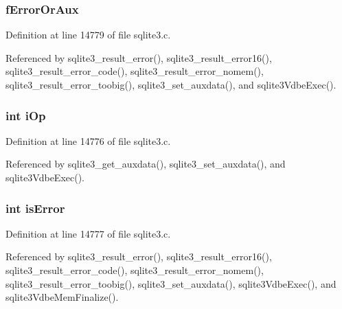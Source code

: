 \subsubsection[{f\+Error\+Or\+Aux}]{ f\+Error\+Or\+Aux}\label{structsqlite3__context_a8899b33d4af2040a45f2159eed439c0b}


Definition at line 14779 of file sqlite3.\+c.



Referenced by sqlite3\+\_\+result\+\_\+error(), sqlite3\+\_\+result\+\_\+error16(), sqlite3\+\_\+result\+\_\+error\+\_\+code(), sqlite3\+\_\+result\+\_\+error\+\_\+nomem(), sqlite3\+\_\+result\+\_\+error\+\_\+toobig(), sqlite3\+\_\+set\+\_\+auxdata(), and sqlite3\+Vdbe\+Exec().

\hypertarget{structsqlite3__context_a7d4638420dcef0fb9e0120bad40857e3}{}
\subsubsection[{i\+Op}]{\setlength{\rightskip}{0pt plus 5cm}int i\+Op}\label{structsqlite3__context_a7d4638420dcef0fb9e0120bad40857e3}


Definition at line 14776 of file sqlite3.\+c.



Referenced by sqlite3\+\_\+get\+\_\+auxdata(), sqlite3\+\_\+set\+\_\+auxdata(), and sqlite3\+Vdbe\+Exec().

\hypertarget{structsqlite3__context_ab70049122fc3811f1ca7ac2229839a26}{}
\subsubsection[{is\+Error}]{\setlength{\rightskip}{0pt plus 5cm}int is\+Error}\label{structsqlite3__context_ab70049122fc3811f1ca7ac2229839a26}


Definition at line 14777 of file sqlite3.\+c.



Referenced by sqlite3\+\_\+result\+\_\+error(), sqlite3\+\_\+result\+\_\+error16(), sqlite3\+\_\+result\+\_\+error\+\_\+code(), sqlite3\+\_\+result\+\_\+error\+\_\+nomem(), sqlite3\+\_\+result\+\_\+error\+\_\+toobig(), sqlite3\+\_\+set\+\_\+auxdata(), sqlite3\+Vdbe\+Exec(), and sqlite3\+Vdbe\+Mem\+Finalize().

